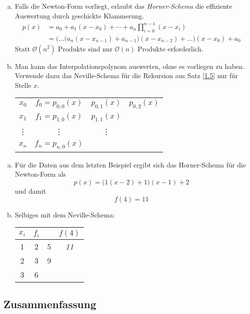 \documentclass[11pt]{scrbook}
\begin{document}
\begin{enumerate}[a)]
	\item 
		Falls die Newton-Form vorliegt, erlaubt das \emph{Horner-Schema} die effiziente Auswertung durch geschickte Klammerung.
		\begin{align*}
			p(x) &= a_0 + a_1(x-x_0) + \dotsb + a_n\prod_{i=0}^{n-1}(x-x_i)\\
				&= \bigg(\dotso \Big(a_n(x-x_{n-1}) + a_{n-1}\Big)(x-x_{n-2}) + \dotso \bigg)(x-x_0) +  a_0
		\end{align*}
		Statt $\mathcal O(n^2)$ Produkte sind nur  $\mathcal O(n)$ Produkte erforderlich.
	\item
		Man kann das Interpolationspolynom auswerten, ohne es vorliegen zu haben.
		Verwende dazu das Neville-Schema für die Rekursion aus Satz \ref{1.5} nur für Stelle $x$.
		\begin{table}[H]
			\centering
			\begin{tabular}{cccc}
				$x_0$ & $f_0=p_{0,0}(x)$ & $p_{0,1}(x)$ & $p_{0,2}(x)$ \\
				$x_1$ & $f_1=p_{1,0}(x)$ & $p_{1,1}(x)$ &  \\
				\vdots & \vdots & \vdots\\
				$x_n$ & $f_n=p_{n,0}(x)$ &\\
			\end{tabular}
		\end{table}
\end{enumerate}

\begin{ex*}
	\begin{enumerate}[a)]
		\item 
			Für die Daten aus dem letzten Beispiel ergibt sich das Horner-Schema für die Newton-Form als
			\[
				p(x) = \Big(1(x-2)+1\Big)(x-1) +2
			\]
			und damit
			\[
				f(4) = 11
			\]
		\item
			Selbiges mit dem Neville-Schema:
			\begin{table}[H]
				\centering
				\begin{tabular}{c|ccc}
					$x_i$ & $f_i$ &  & $f(4)$ \\ \hline
					1 & 2 & 5 & \emph{11}\\
					2 & 3 & 9\\
					3 & 6
				\end{tabular}
			\end{table}
	\end{enumerate}
\end{ex*}

\subsection{Zusammenfassung}
\end{document}
